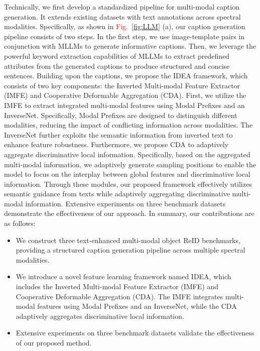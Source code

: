 Technically, we first develop a standardized pipeline for multi-modal caption generation.
%
It extends existing datasets with text annotations across spectral modalities. 
%
Specifically, as shown in \textcolor{red}{Fig.}~\ref{fig:LLM} (a), our caption generation pipeline consists of two steps.
%
In the first step, we use image-template pairs in conjunction with MLLMs to generate informative captions.  
%
Then, we leverage the powerful keyword extraction capabilities of MLLMs to extract predefined attributes from the generated captions to produce structured and concise sentences.
%
Building upon the captions, we propose the IDEA framework, which consists of two key components: the Inverted Multi-modal Feature Extractor (IMFE) and Cooperative Deformable Aggregation (CDA). 
%
First, we utilize the IMFE to extract integrated multi-modal features using Modal Prefixes and an InverseNet. 
%
Specifically, Modal Prefixes are designed to distinguish different modalities, reducing the impact of conflicting information across modalities. 
%
The InverseNet further exploits the semantic information from inverted text to enhance feature robustness.
%
Furthermore, we propose CDA to adaptively aggregate discriminative local information. 
%
Specifically, based on the aggregated multi-modal information, we adaptively generate sampling positions to enable the model to focus on the interplay between global features and discriminative local information.
%
Through these modules, our proposed framework effectively utilizes semantic guidance from texts while adaptively aggregating discriminative multi-modal information.
%
Extensive experiments on three benchmark datasets demonstrate the effectiveness of our approach.
%
In summary, our contributions are as follows:
\begin{itemize}
  \item We construct three text-enhanced multi-modal object ReID benchmarks, providing a structured caption generation pipeline across multiple spectral modalities.
  \item We introduce a novel feature learning framework named IDEA, which includes the Inverted Multi-modal Feature Extractor (IMFE) and Cooperative Deformable Aggregation (CDA). 
  The IMFE integrates multi-modal features using Modal Prefixes and an InverseNet, while the CDA adaptively aggregates discriminative local information.
  \item Extensive experiments on three benchmark datasets validate the effectiveness of our proposed method.
\end{itemize}